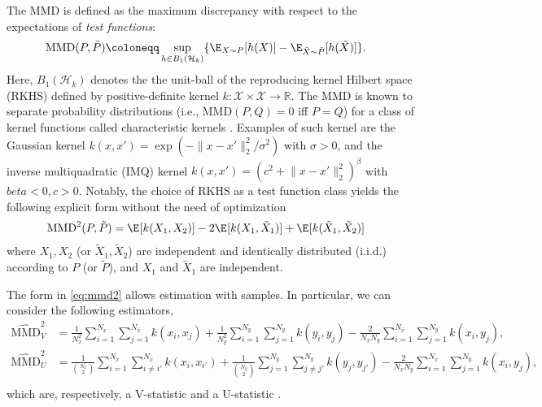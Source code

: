 The MMD is defined as the maximum discrepancy with respect to the expectations of \emph{test functions}:
\begin{align}
    \mathrm{MMD}(P, \tilde{P})&\coloneqq\sup_{h \in B_1(\mathcal{H}_k)} \{\E_{X\sim P}[h(X)]-\E_{\tilde{X}\sim \tilde{P}}[h(\tilde{X})]\}.
\label{eq:mmd}
\end{align}
Here, $B_1(\mathcal{H}_k)$ denotes the the unit-ball of the reproducing kernel Hilbert space (RKHS) \citep{} defined by positive-definite kernel $k: \mathcal{X}\times\mathcal{X} \to \mathbb{R}$.
The MMD is known to separate probability distributions (i.e., $\mathrm{MMD}(P,Q) = 0$ iff $P=Q$) for a class of kernel functions called characteristic kernels \citep{}. 
Examples of such kernel are the Gaussian kernel $k(x,x')=\exp(-\lVert x-x' \rVert_2^2/\sigma^2)$ with $\sigma>0$, and the inverse multiquadratic (IMQ) kernel $k(x,x')= (c^2+\lVert x-x' \rVert_2^2)^{\beta}$ with $beta<0, c>0$. 
Notably, the choice of RKHS as a test function class yields the following explicit form without the need of optimization 
\begin{align}
    \mathrm{MMD}^2(P, \tilde{P})&=\E_{}[k(X_1, X_2)]-2\E_{}[k(X_1, \tilde{X}_1)] + \E_{}[k(\tilde{X}_1, \tilde{X}_2)]\label{eq:mmd2}
\end{align}
where $X_1, X_2$ (or $\tilde{X}_1, \tilde{X}_2$) are independent and identically distributed (i.i.d.) according to $P$ (or $\tilde{P}$), and $X_1$ and $\tilde{X}_1$ are independent. 

The form in \eqref{eq:mmd2} allows estimation with samples. 
In particular, we can consider the following estimators, 
\begin{align}
        \widehat{\mathrm{MMD}}_{V}^{2} &= \frac{1}{N_{x}^{2}} \sum_{i=1}^{N_{x}} \sum_{j=1}^{N_{x}} k\left(x_{i}, x_{j}\right)+\frac{1}{N_{y}^{2}} \sum_{i=1}^{N_{y}} \sum_{j=1}^{N_{y}} k\left(y_{i}, y_{j}\right)
        -\frac{2}{N_{x} N_{y}} \sum_{i=1}^{N_{x}} \sum_{j=1}^{N_{y}} k\left(x_{i}, y_{j}\right), \label{eq:mmd_biased}\\
    \widehat{\mathrm{MMD}}_{U}^{2} &= \frac{1}{{N_{x}\choose 2}} \sum_{i = 1}^{N_{x}} \sum_{i \neq i'}^{N_{x}} k\left(x_{i}, x_{i'}\right)+\frac{1}{{N_{y}\choose 2}} \sum_{j = 1}^{N_{y}} \sum_{j \neq j'}^{N_{y}} k\left(y_{j}, y_{j'}\right)-\frac{2}{N_{x}N_{y}} \sum_{i = 1}^{N_{x}} \sum_{j = 1}^{N_{y}} k\left(x_{i}, y_{j}\right),  \label{eq:mmd_unbiased}\\
\end{align}
which are, respectively, a V-statistic \citep{} and a U-statistic \citep{}.

